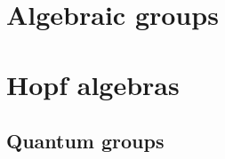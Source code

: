 \documentclass{../../large}
\begin{document}
\part{Algebraic groups}




\part{Hopf algebras}
\chapter{}
\chapter{Quantum groups}
\end{document}
